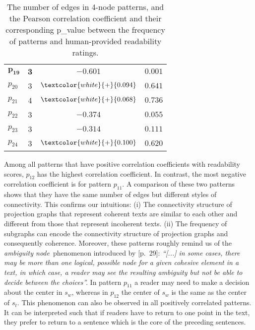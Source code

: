 \begin{table}[!ht]
\begin{center}
\begin{tabular}{lccc}
			$\mathbf{p_{19}}$	& \textbf{3} 	  & $\mathbf{-0.601}$ 				& $\mathbf{0.001}$			\\
			$p_{20}$			& 3 			  & $\textcolor{white}{+}{0.094}$   & $0.641$					\\
			$p_{21}$			& 4 			  & $\textcolor{white}{+}{0.068}$	& $0.736$				    \\
			$p_{22}$			& 3				  & $-0.374$ 						& $0.055$					\\
			$p_{23}$			& 3				  & $-0.314$ 						& $0.111$					\\
			$p_{24}$ 			& 3				  & $\textcolor{white}{+}{0.100}$   & $0.620$					\\
			\bottomrule
		\end{tabular}
	\end{center}
	\caption{The number of edges in 4-node patterns, and the Pearson correlation coefficient and their corresponding p\_value between the frequency of patterns and human-provided readability ratings.} 
	\label{tab:correlation-4node}
\end{table}

Among all patterns that have positive correlation coefficients with readability scores, $p_{12}$ has the highest correlation coefficient. 
In contrast, the most negative correlation coefficient is for pattern $p_{11}$. 
A comparison of these two patterns shows that they have the same number of edges but different styles of connectivity.
This confirms our intuitions: (i) The connectivity structure of projection graphs that represent coherent texts are similar to each other and different from those that represent incoherent texts. 
(ii) The frequency of subgraphs can encode the connectivity structure of projection graphs and consequently coherence. 
Moreover, these patterns roughly remind us of the \emph{ambiguity node}\ phenomenon introduced by  [p.\ 29]: 
\emph{
    ``[...] in some cases, there may be more than one logical, possible node for a given cohesive element in a text, in which case, a reader may see the resulting ambiguity but not be able to decide between the choices''.
    }
In pattern $p_{11}$ a reader may need to make a decision about the center in $s_w$, whereas in $p_{12}$ the center of $s_w$ is the same as the center of $s_t$. 
This phenomenon can also be observed in all positively correlated patterns.  
It can be interpreted such that if readers have to return to one point in the text, they prefer to return to a sentence which is the core of the preceding sentences.

